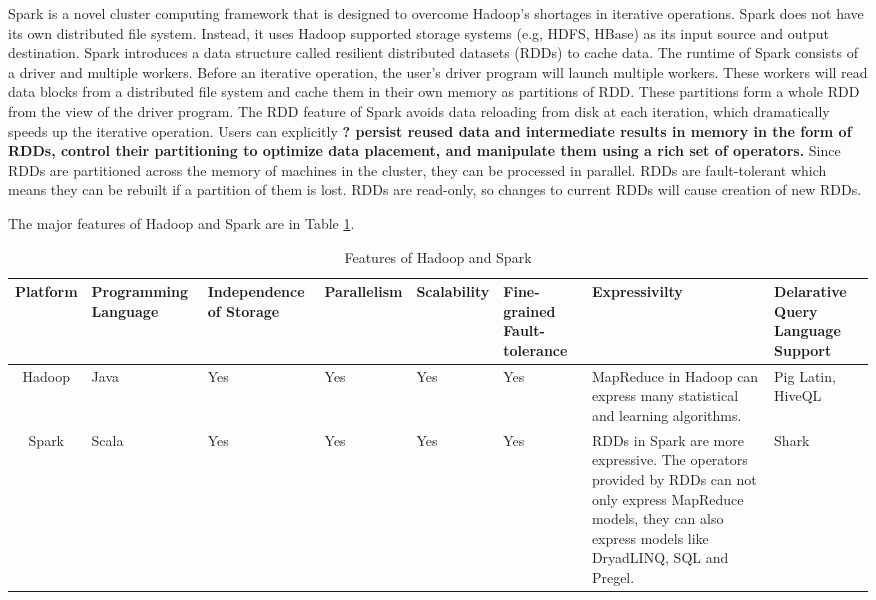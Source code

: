 \documentclass[12pt,conference,letterpaper]{IEEEtran}
\begin{document}
 
Spark is a novel cluster computing framework that is designed to overcome Hadoop's shortages in iterative operations. Spark does not have its own distributed file system. Instead, it uses Hadoop supported storage systems (e.g, HDFS, HBase) as its input source and output destination.  Spark introduces a data structure called resilient distributed datasets (RDDs)  to cache data. The runtime of Spark consists of a driver and multiple workers. Before an iterative operation, the user's driver program will launch multiple workers. These workers will read data blocks from a distributed file system and cache them in their own memory as partitions of RDD. These partitions form a whole RDD from the view of the driver program. The RDD feature of Spark avoids data reloading from disk at each iteration, which dramatically speeds up the iterative operation. Users can explicitly {\bf ? persist reused data and intermediate results in memory in the form of RDDs, control their partitioning to optimize data placement, and manipulate them using a rich set of operators.} Since RDDs are partitioned across the memory of machines in the cluster, they can be processed in parallel. RDDs are fault-tolerant which means they can be rebuilt if a partition of them is lost. RDDs are read-only, so changes to current RDDs will cause creation of new RDDs.


The major features of Hadoop and Spark are in Table \ref{tab:feature_hdpspk}.

  \begin{table}[!t]
  \renewcommand{\arraystretch}{1.3}
  \centering
  \begin{tabular}{|c|m{1.5cm}<{\centering}|m{1.5cm}<{\centering}|m{1.5cm}<{\centering}|m{1.5cm}<{\centering}|m{2cm}<{\centering}|m{4cm}<{\centering}|m{2cm}<{\centering}|}
  \hline
  \bfseries Platform & \bfseries Programming Language & \bfseries Independence of Storage & \bfseries Parallelism & \bfseries Scalability & \bfseries Fine-grained Fault-tolerance & \bfseries Expressivilty & \bfseries Delarative Query Language Support\\
  \hline
  Hadoop & Java & Yes & Yes & Yes & Yes & MapReduce in Hadoop can express many statistical and learning algorithms. & Pig Latin, HiveQL \\
  Spark & Scala & Yes & Yes & Yes & Yes  & RDDs in Spark are more expressive. The operators provided by RDDs can not only express MapReduce models, they can also express models like DryadLINQ, SQL and Pregel. & Shark \\
  \hline
  \end{tabular}
  \caption{Features of Hadoop and Spark}
  \label{tab:feature_hdpspk}
  \end{table}
\end{document}
